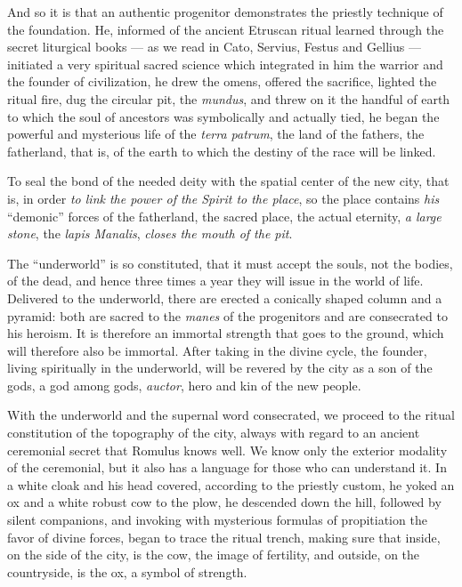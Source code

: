 And so it is that an authentic progenitor demonstrates the priestly technique of the foundation. He, informed of the ancient Etruscan ritual learned through the secret liturgical books --- as we read in Cato, Servius, Festus and Gellius --- initiated a very spiritual sacred science which integrated in him the warrior and the founder of civilization, he drew the omens, offered the sacrifice, lighted the ritual fire, dug the circular pit, the \emph{mundus}, and threw on it the handful of earth to which the soul of ancestors was symbolically and actually tied, he began the powerful and mysterious life of the \emph{terra patrum}, the land of the fathers, the fatherland, that is, of the earth to which the destiny of the race will be linked.

To seal the bond of the needed deity with the spatial center of the new city, that is, in order \emph{to link the power of the Spirit to the place}, so the place contains \emph{his} ``demonic'' forces of the fatherland, the sacred place, the actual eternity, \emph{a large stone}, the \emph{lapis Manalis}, \emph{closes the mouth of the pit}.

The ``underworld'' is so constituted, that it must accept the souls, not the bodies, of the dead, and hence three times a year they will issue in the world of life. Delivered to the underworld, there are erected a conically shaped column and a pyramid: both are sacred to the \emph{manes} of the progenitors and are consecrated to his heroism. It is therefore an immortal strength that goes to the ground, which will therefore also be immortal. After taking in the divine cycle, the founder, living spiritually in the underworld, will be revered by the city as a son of the gods, a god among gods, \emph{auctor}, hero and kin of the new people.

With the underworld and the supernal word consecrated, we proceed to the ritual constitution of the topography of the city, always with regard to an ancient ceremonial secret that Romulus knows well. We know only the exterior modality of the ceremonial, but it also has a language for those who can understand it. In a white cloak and his head covered, according to the priestly custom, he yoked an ox and a white robust cow to the plow, he descended down the hill, followed by silent companions, and invoking with mysterious formulas of propitiation the favor of divine forces, began to trace the ritual trench, making sure that inside, on the side of the city, is the cow, the image of fertility, and outside, on the countryside, is the ox, a symbol of strength.

